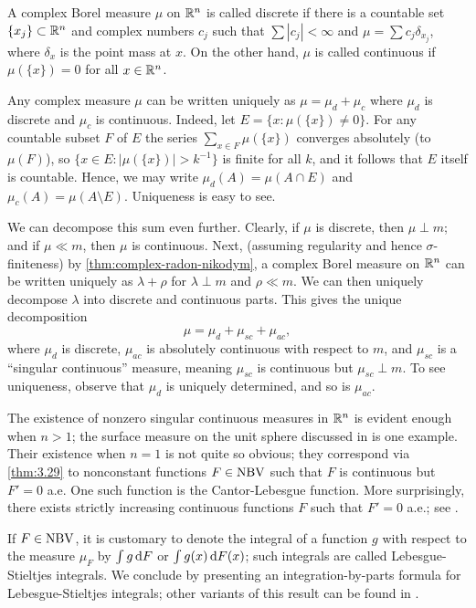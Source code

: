 \documentclass[12pt]{article} %
\begin{document}
\begin{definition}
    A complex Borel measure $\mu$ on $\mathbb{R}^n$ is called discrete if there is a countable set $\{x_j\} \subset \mathbb{R}^n$ and complex numbers $c_j$ such that $\sum |c_j| < \infty$ and $\mu = \sum c_j \delta_{x_j}$, where $\delta_x$ is the point mass at $x$. On the other hand, $\mu$ is called continuous if $\mu(\{x\}) = 0$ for all $x \in \mathbb{R}^n$. 
\end{definition}

\noindent Any complex measure $\mu$ can be written uniquely as $\mu = \mu_d + \mu_c$ where $\mu_d$ is discrete and $\mu_c$ is continuous. Indeed, let $E = \{x : \mu(\{x\}) \neq 0\}$. For any countable subset $F$ of $E$ the series $\sum_{x \in F} \mu(\{x\})$ converges absolutely (to $\mu(F)$), so $\{x \in E : |\mu(\{x\})| > k^{-1}\}$ is finite for all $k$, and it follows that $E$ itself is countable. Hence, we may write $\mu_d(A) = \mu(A \cap E)$ and $\mu_c(A) = \mu(A \setminus E)$. Uniqueness is easy to see.

We can decompose this sum even further. Clearly, if $\mu$ is discrete, then $\mu \perp m$; and if $\mu \ll m$, then $\mu$ is continuous. Next, (assuming regularity and hence $\sigma$-finiteness) by \cref{thm:complex-radon-nikodym}, a complex Borel measure on $\mathbb{R}^n$ can be written uniquely as $\lambda + \rho$ for $\lambda \perp m$ and $\rho \ll m$. We can then uniquely decompose $\lambda$ into discrete and continuous parts. This gives the unique decomposition \[\mu = \mu_d + \mu_{sc} + \mu_{ac},\] where $\mu_d$ is discrete, $\mu_{ac}$ is absolutely continuous with respect to $m$, and $\mu_{sc}$ is a ``singular continuous'' measure, meaning $\mu_{sc}$ is continuous but $\mu_{sc} \perp m$. To see uniqueness, observe that $\mu_d$ is uniquely determined, and so is $\mu_{ac}$.

The existence of nonzero singular continuous measures in $\mathbb{R}^n$ is evident enough when $n > 1$; the surface measure on the unit sphere discussed in  is one example. Their existence when $n = 1$ is not quite so obvious; they correspond via \cref{thm:3.29} to nonconstant functions $F \in \operatorname{NBV}$ such that $F$ is continuous but $F' = 0$ a.e. One such function is the Cantor-Lebesgue function. More surprisingly, there exists strictly increasing continuous functions $F$ such that $F' = 0$ a.e.; see \citet[Exercise~40]{folland1999real}.

If $F \in \operatorname{NBV}$, it is customary to denote the integral of a function $g$ with respect to the measure $\mu_F$ by $\int g \, \mathrm{d} F$ or $\int g(x)\, \mathrm{d} F(x)$; such integrals are called Lebesgue-Stieltjes integrals. We conclude by presenting an integration-by-parts formula for Lebesgue-Stieltjes integrals; other variants of this result can be found in \citet[Exercises~34, 35]{folland1999real}.
\end{document}
